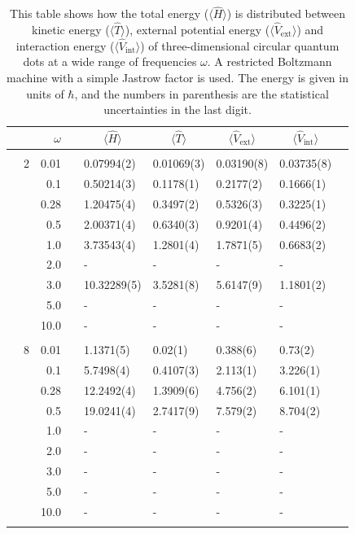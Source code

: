 \begin{table}
	\caption{This table shows how the total energy ($\langle\hat{H}\rangle$) is distributed between kinetic energy ($\langle\hat{T}\rangle$), external potential energy ($\langle\hat{V}_{\text{ext}}\rangle$) and interaction energy ($\langle\hat{V}_{\text{int}}\rangle$) of three-dimensional circular quantum dots at a wide range of frequencies $\omega$. A restricted Boltzmann machine with a simple Jastrow factor is used. The energy is given in units of $\hbar$, and the numbers in parenthesis are the statistical uncertainties in the last digit.}
	\label{tab:splitfrequencyQDRBMSJ3D}
	\begin{tabularx}{\textwidth}{R{1cm}rrcR{2.3cm}R{2.3cm}R{2.3cm}R{2.3cm}R{1cm}} \hline\hline
		&\makecell{\\ \phantom{$N$} \\ \phantom{=}} & $\omega$ &&  &  &  &  \\ \hline \\
		&2 & 0.01 && 0.07994(2) & 0.01069(3) & 0.03190(8) & 0.03735(8) \\
		&& 0.1 && 0.50214(3) & 0.1178(1) & 0.2177(2) & 0.1666(1) \\
		&& 0.28 && 1.20475(4) & 0.3497(2) & 0.5326(3) & 0.3225(1) \\
		&& 0.5 && 2.00371(4) & 0.6340(3) & 0.9201(4) & 0.4496(2) \\
		&& 1.0 && 3.73543(4) & 1.2801(4) & 1.7871(5) & 0.6683(2) \\
		&& 2.0 && - & - & - & -\\
		&& 3.0 && 10.32289(5) & 3.5281(8) & 5.6147(9) & 1.1801(2) \\ 
		&& 5.0 && - & - & - & -\\
		&& 10.0 && - & - & - & -\\
		\hdashline \\
		
		&8 & 0.01 && 1.1371(5) & 0.02(1) & 0.388(6) & 0.73(2) \\
		&& 0.1 && 5.7498(4) & 0.4107(3) & 2.113(1) & 3.226(1) \\
		&& 0.28 && 12.2492(4) & 1.3909(6) & 4.756(2) & 6.101(1) \\
		&& 0.5 && 19.0241(4) & 2.7417(9) & 7.579(2) & 8.704(2) \\
		&& 1.0 && - & - & - & - \\
		&& 2.0 && - & - & - & -\\
		&& 3.0 && - & - & - & - \\ 
		&& 5.0 && - & - & - & -\\
		&& 10.0 && - & - & - & -\\
		\hdashline \\
		

\end{tabularx}
\end{table}
